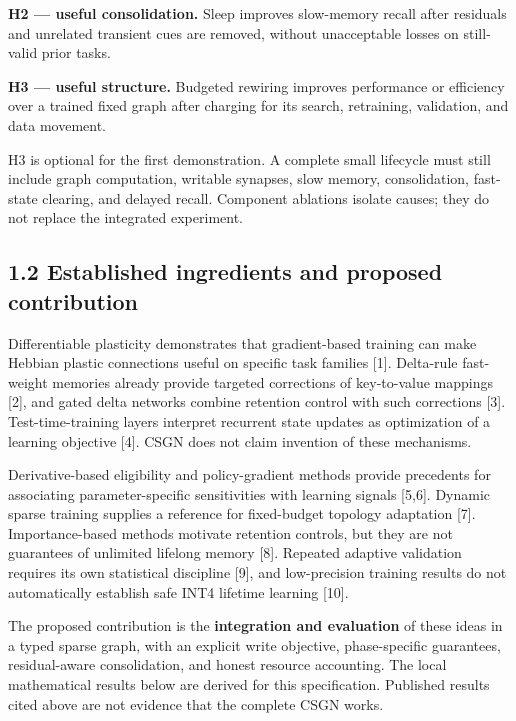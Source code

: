 \documentclass[
  11pt,
  a4paper,
]{article}
\begin{document}
\textbf{H2 --- useful consolidation.} Sleep improves slow-memory recall
after residuals and unrelated transient cues are removed, without
unacceptable losses on still-valid prior tasks.

\textbf{H3 --- useful structure.} Budgeted rewiring improves performance
or efficiency over a trained fixed graph after charging for its search,
retraining, validation, and data movement.

H3 is optional for the first demonstration. A complete small lifecycle
must still include graph computation, writable synapses, slow memory,
consolidation, fast-state clearing, and delayed recall. Component
ablations isolate causes; they do not replace the integrated experiment.

\subsection{1.2 Established ingredients and proposed
contribution}\label{established-ingredients-and-proposed-contribution}

Differentiable plasticity demonstrates that gradient-based training can
make Hebbian plastic connections useful on specific task families
{[}1{]}. Delta-rule fast-weight memories already provide targeted
corrections of key-to-value mappings {[}2{]}, and gated delta networks
combine retention control with such corrections {[}3{]}.
Test-time-training layers interpret recurrent state updates as
optimization of a learning objective {[}4{]}. CSGN does not claim
invention of these mechanisms.

Derivative-based eligibility and policy-gradient methods provide
precedents for associating parameter-specific sensitivities with
learning signals {[}5,6{]}. Dynamic sparse training supplies a reference
for fixed-budget topology adaptation {[}7{]}. Importance-based methods
motivate retention controls, but they are not guarantees of unlimited
lifelong memory {[}8{]}. Repeated adaptive validation requires its own
statistical discipline {[}9{]}, and low-precision training results do
not automatically establish safe INT4 lifetime learning {[}10{]}.

The proposed contribution is the \textbf{integration and evaluation} of
these ideas in a typed sparse graph, with an explicit write objective,
phase-specific guarantees, residual-aware consolidation, and honest
resource accounting. The local mathematical results below are derived
for this specification. Published results cited above are not evidence
that the complete CSGN works.
\end{document}
